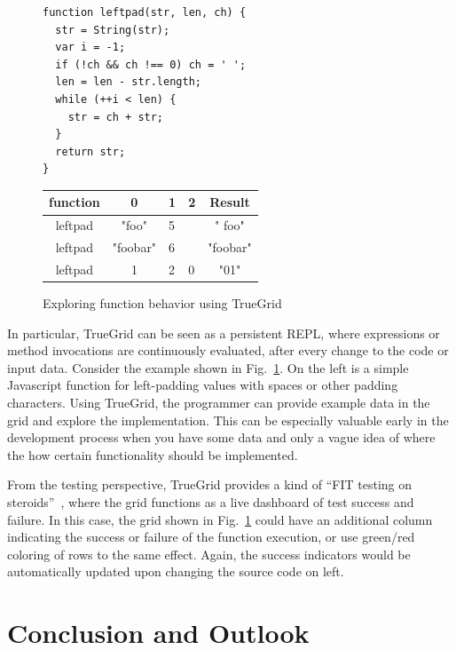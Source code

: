 \documentclass{llncs}
\begin{document}
\begin{figure}[t]
\begin{minipage}{0.6\linewidth}
\begin{lstlisting}
function leftpad(str, len, ch) {
  str = String(str);
  var i = -1;
  if (!ch && ch !== 0) ch = ' ';
  len = len - str.length;
  while (++i < len) {
    str = ch + str;
  }
  return str;
}
\end{lstlisting}
\end{minipage}
\begin{minipage}{0.4\linewidth}
\centering
\sffamily
\begin{tabular}{|c|c|m{0.5cm}|p{0.5cm}|c|}\hline
function & 0 & 1 & 2 & Result \\\hline\hline
leftpad & "foo" & 5 &  & "  foo" \\\hline
leftpad & "foobar" & 6 & & "foobar" \\\hline
leftpad & 1 & 2 & 0 & "01"\\\hline
\end{tabular}
\end{minipage}
\caption{Exploring function behavior using TrueGrid}
\label{FIG:leftpad}
\end{figure}

In particular, TrueGrid can be seen as a persistent REPL, where expressions or method invocations are continuously evaluated, after every change to the code or input data. 
Consider the example shown in Fig.~\ref{FIG:leftpad}.
On the left is a simple Javascript function for left-padding values with spaces or other padding characters. 
Using TrueGrid, the programmer can provide example data in the grid and explore the implementation. This can be especially valuable early in the development process when  you have some data and only a vague idea of where the how certain functionality should be implemented.

From the testing perspective, TrueGrid provides a kind of ``FIT testing on steroids''~\cite{mugridge2005fit}, where the grid functions as a live dashboard of test success and failure. 
In this case, the grid shown in Fig.~\ref{FIG:leftpad} could have an additional column indicating the success or failure of the function execution, or use green/red coloring of rows to the same effect.
Again, the success indicators would be automatically updated upon changing the source code on left. 


\section{Conclusion and Outlook}
\end{document}
